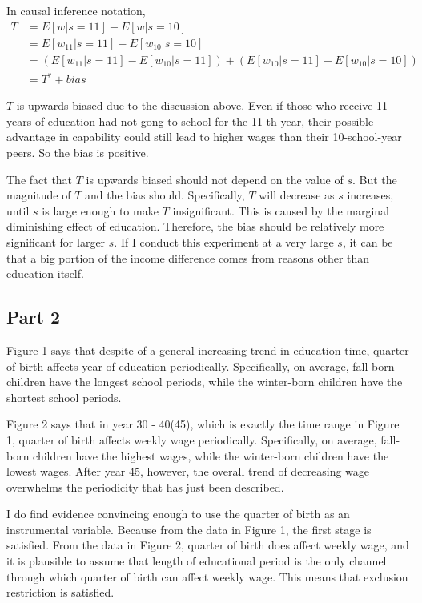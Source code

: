 \documentclass{article}
\begin{document}
In causal inference notation,
\begin{align*}
T&=E[w|s=11]-E[w|s=10]\\
&=E[w_{11}|s={11}]-E[w_{10}|s={10}]\\
&=(E[w_{11}|s={11}]-E[w_{10}|s={11}])+(E[w_{10}|s={11}]-E[w_{10}|s={10}])\\
&=T^*+bias
\end{align*}

$T$ is upwards biased due to the discussion above. Even if those who receive 11 years of education had not gong to school for the 11-th year, their possible advantage in capability could still lead to higher wages than their 10-school-year peers. So the bias is positive.

The fact that $T$ is upwards biased should not depend on the value of $s$. But the magnitude of $T$ and the bias should. Specifically, $T$ will decrease as $s$ increases, until $s$ is large enough to make $T$ insignificant. This is caused by the marginal diminishing effect of education. Therefore, the bias should be relatively more significant for larger $s$. If I conduct this experiment at a very large $s$, it can be that a big portion of the income difference comes from reasons other than education itself.

\subsection{Part 2}
Figure 1 says that despite of a general increasing trend in education time, quarter of birth affects year of education periodically. Specifically, on average, fall-born children have the longest school periods, while the winter-born children have the shortest school periods.

Figure 2 says that in year 30 - 40(45), which is exactly the time range in Figure 1, quarter of birth affects weekly wage periodically. Specifically, on average, fall-born children have the highest wages, while the winter-born children have the lowest wages. After year 45, however, the overall trend of decreasing wage overwhelms the periodicity that has just been described.

I do find evidence convincing enough to use the quarter of birth as an instrumental variable. Because from the data in Figure 1, the first stage is satisfied. From the data in Figure 2, quarter of birth does affect weekly wage, and it is plausible to assume that length of educational period is the only channel through which quarter of birth can affect weekly wage. This means that exclusion restriction is satisfied.
\end{document}
